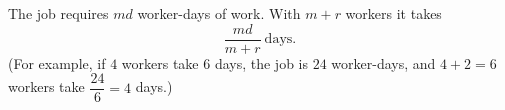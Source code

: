 The job requires $md$ worker-days of work. With $m+r$ workers it takes
\[
\boxed{\dfrac{md}{m+r}}\ \text{days}.
\]
(For example, if $4$ workers take $6$ days, the job is $24$ worker-days, and $4+2=6$ workers take $\dfrac{24}{6}=4$ days.)
